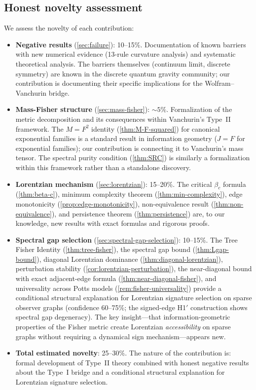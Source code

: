 \documentclass[11pt]{article}
\theoremstyle{definition}
\theoremstyle{remark}
\begin{document}
\subsection{Honest novelty assessment}
\label{sec:novelty}

We assess the novelty of each contribution:

\begin{itemize}
\item \textbf{Negative results} (\cref{sec:failure}): 10--15\%.
  Documentation of known barriers with new numerical evidence
  (13-rule curvature analysis) and systematic theoretical analysis.
  The barriers themselves (continuum limit, discrete symmetry) are
  known in the discrete quantum gravity community; our contribution
  is documenting their specific implications for the Wolfram--Vanchurin
  bridge.

\item \textbf{Mass-Fisher structure} (\cref{sec:mass-fisher}): $\sim 5\%$.
  Formalization of the metric decomposition and its consequences within
  Vanchurin's Type~II framework.
  The $M = F^2$ identity (\cref{thm:M-F-squared}) for canonical
  exponential families is a standard result in information geometry
  ($J = F$ for exponential families); our contribution is connecting
  it to Vanchurin's mass tensor.
  The spectral purity condition (\cref{thm:SRC}) is similarly a
  formalization within this framework rather than a standalone
  discovery.

\item \textbf{Lorentzian mechanism} (\cref{sec:lorentzian}): 15--20\%.
  The critical $\beta_c$ formula (\cref{thm:beta-c}), minimum complexity
  theorem (\cref{thm:min-complexity}), edge monotonicity
  (\cref{prop:edge-monotonicity}), non-equivalence result
  (\cref{thm:non-equivalence}), and persistence theorem
  (\cref{thm:persistence}) are, to our knowledge, new results with
  exact formulas and rigorous proofs.

\item \textbf{Spectral gap selection} (\cref{sec:spectral-gap-selection}):
  10--15\%.
  The Tree Fisher Identity (\cref{thm:tree-fisher}), the spectral gap
  bound (\cref{thm:Lgap-bound}), diagonal Lorentzian dominance
  (\cref{thm:diagonal-lorentzian}), perturbation stability
  (\cref{cor:lorentzian-perturbation}), the near-diagonal bound with
  exact adjacent-edge formula (\cref{thm:near-diagonal-fisher}), and
  universality across Potts models
  (\cref{rem:fisher-universality}) provide a conditional structural
  explanation for Lorentzian signature selection on sparse observer
  graphs (confidence 60--75\%; the signed-edge H1$'$ construction
  shows spectral gap degeneracy).
  The key insight---that information-geometric properties of the Fisher
  metric create Lorentzian \emph{accessibility} on sparse graphs without
  requiring a dynamical sign mechanism---appears new.

\item \textbf{Total estimated novelty}: 25--30\%.
  The nature of the contribution is: formal development of Type~II
  theory combined with honest negative results about the Type~I
  bridge and a conditional structural explanation for Lorentzian
  signature selection.
\end{itemize}
\end{document}
